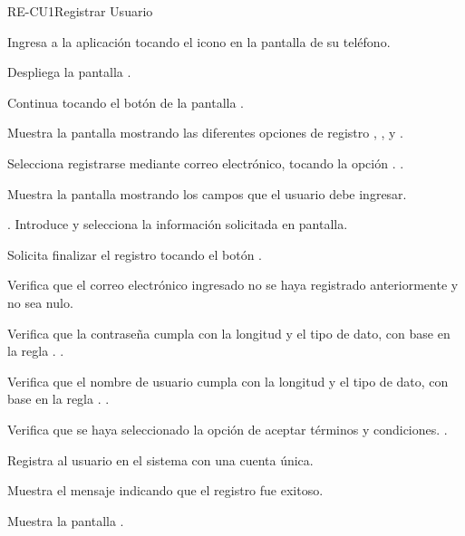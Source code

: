 \begin{UseCase}{RE-CU1}{Registrar Usuario}
{%
		}
	\end{UseCase}
	\begin{UCtrayectoria}
		\UCpaso [\UCactor] Ingresa a la aplicación tocando el icono  en la pantalla de su teléfono.
		
		\UCpaso Despliega la pantalla  .
		
		\UCpaso [\UCactor] Continua tocando el  botón  de la pantalla .
		
		\UCpaso Muestra la pantalla  mostrando las diferentes opciones de registro , ,  y .
		
		\UCpaso [\UCactor] Selecciona registrarse mediante correo electrónico, tocando la opción .  .
		
		\UCpaso Muestra la pantalla  mostrando los campos que el usuario debe ingresar.
		
		\UCpaso [\UCactor] \label{RE-CU1:IntroduceInformacion}. Introduce y selecciona la información solicitada en pantalla.
		
		\UCpaso [\UCactor] Solicita finalizar el registro tocando el botón .
		
		\UCpaso Verifica que el correo electrónico ingresado no se haya registrado anteriormente y no sea nulo.  
		
		\UCpaso Verifica que la contraseña cumpla con la longitud y el tipo de dato, con base en la regla .  .
			
		\UCpaso Verifica que el nombre de usuario cumpla con la longitud y el tipo de dato, con base en la regla .  .
		
		\UCpaso Verifica que se haya seleccionado la opción de aceptar términos y condiciones.  .
		
		\UCpaso Registra al usuario en el sistema con una cuenta única. 
		
		\UCpaso Muestra el mensaje  indicando que el registro fue exitoso.
		
		\UCpaso \label{RE-CU1:Pantalla}Muestra la pantalla .
		
	\end{UCtrayectoria}

